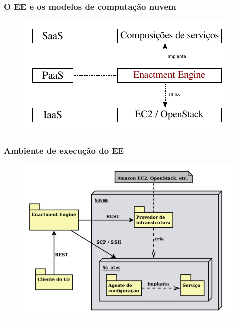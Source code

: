 \documentclass{beamer}
\begin{document}

\begin{frame}
\frametitle{O EE e os modelos de computação nuvem}

\begin{figure}
\includegraphics[width=1\linewidth]{img/nuvem_modelos}
\end{figure}

\end{frame}


\begin{frame}
\frametitle{Ambiente de execução do EE}

\begin{figure}
\includegraphics[width=0.8\linewidth]{img/arquitetura}
\end{figure}

\end{frame}

\end{document}
